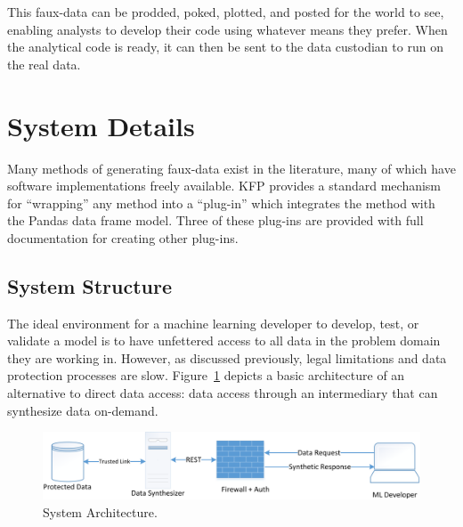 \documentclass{article}
\begin{document}
This faux-data can be prodded, poked, plotted, and posted for the world to see, enabling analysts to develop their code using whatever means they prefer.   When the analytical code is ready, it can then be sent to the data custodian to run on the real data.


\section{System Details}


Many methods of generating faux-data exist in the literature, many of which have software implementations freely available.   KFP provides a standard mechanism for ``wrapping'' any method into a ``plug-in'' which integrates the method with the Pandas data frame model.  Three of these plug-ins are provided with full documentation for creating other plug-ins.

\subsection{System Structure}

The ideal environment for a machine learning developer to develop, test, or validate a model is to have unfettered access to all data in the problem domain they are working in. However, as discussed previously, legal limitations and data protection processes are slow. Figure~\ref{fig:architecture} depicts a basic architecture of an alternative to direct data access: data access through an intermediary that can synthesize data on-demand.

\begin{figure}[ht]
  \centering
  \includegraphics[width=\textwidth]{prototype_architecture}
  \caption{System Architecture.}
  \label{fig:architecture}
\end{figure}
\end{document}
